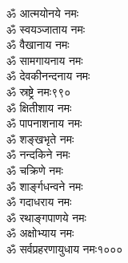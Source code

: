 \begin{multicols}{2}
\begin{flushleft}
ॐ आत्मयोनये नमः\\
ॐ स्वयञ्जाताय नमः\\
ॐ वैखानाय नमः\\
ॐ सामगायनाय नमः\\
ॐ देवकीनन्दनाय नमः\\
ॐ स्रष्ट्रे नमः\hfill ९९०\\
ॐ क्षितीशाय नमः\\
ॐ पापनाशनाय नमः\\
ॐ शङ्खभृते नमः\\
ॐ नन्दकिने नमः\\
ॐ चक्रिणे नमः\\
ॐ शार्ङ्गधन्वने नमः\\
ॐ गदाधराय नमः\\
ॐ रथाङ्गपाणये नमः\\
ॐ अक्षोभ्याय नमः\\
ॐ सर्वप्रहरणायुधाय नमः\hfill १०००
\end{flushleft}
\end{multicols}

